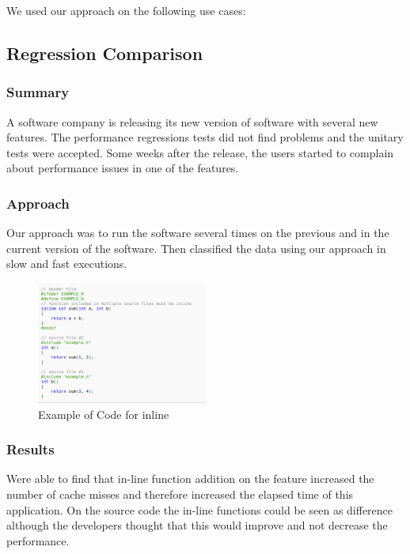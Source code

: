 We used our approach on the following use cases:

\subsection{Regression Comparison}
    
\subsubsection{Summary}
    A software company is releasing its new version of software with several new features. The performance regressions tests did not find problems and the unitary tests were accepted. Some weeks after the release, the users started to complain about performance issues in one of the features.
    
\subsubsection{Approach}
    Our approach was to run the software several times on the previous and in the current version of the software. Then classified the data using our approach in slow and fast executions. 
    
    \begin{figure}[h]
      \centering
        \includegraphics[width=0.50\textwidth]{figures/inline_example.png}
        \caption{Example of Code for inline}
        \label{fig:caseOpt}
    \end{figure}

\subsubsection{Results}
    Were able to find that in-line function addition on the feature increased the number of cache misses and therefore increased the elapsed time of this application. On the source code the in-line functions could be seen as difference although the developers thought that this would improve and not decrease the performance.
    
